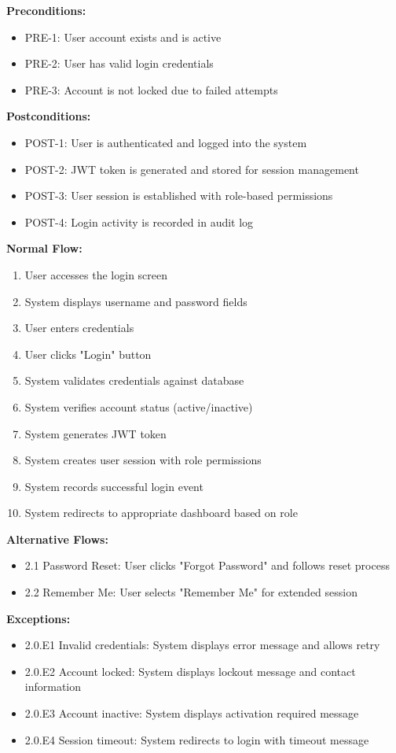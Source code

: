 \documentclass[12pt,a4paper]{article}
\begin{document}
\textbf{Preconditions:}
\begin{itemize}
\item PRE-1: User account exists and is active
\item PRE-2: User has valid login credentials
\item PRE-3: Account is not locked due to failed attempts
\end{itemize}

\textbf{Postconditions:}
\begin{itemize}
\item POST-1: User is authenticated and logged into the system
\item POST-2: JWT token is generated and stored for session management
\item POST-3: User session is established with role-based permissions
\item POST-4: Login activity is recorded in audit log
\end{itemize}

\textbf{Normal Flow:}
\begin{enumerate}
\item User accesses the login screen
\item System displays username and password fields
\item User enters credentials
\item User clicks "Login" button
\item System validates credentials against database
\item System verifies account status (active/inactive)
\item System generates JWT token
\item System creates user session with role permissions
\item System records successful login event
\item System redirects to appropriate dashboard based on role
\end{enumerate}

\textbf{Alternative Flows:}
\begin{itemize}
\item 2.1 Password Reset: User clicks "Forgot Password" and follows reset process
\item 2.2 Remember Me: User selects "Remember Me" for extended session
\end{itemize}

\textbf{Exceptions:}
\begin{itemize}
\item 2.0.E1 Invalid credentials: System displays error message and allows retry
\item 2.0.E2 Account locked: System displays lockout message and contact information
\item 2.0.E3 Account inactive: System displays activation required message
\item 2.0.E4 Session timeout: System redirects to login with timeout message
\end{itemize}
\end{document}
